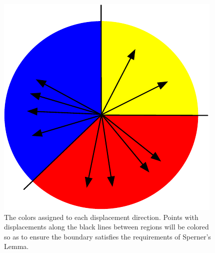   \begin{figure}
    \centering
    \includegraphics[scale=0.5]{ColorMap}
    \caption{The colors assigned to each displacement direction. Points with displacements along the black lines between regions will be colored so as to ensure the boundary satisfies the requirements of Sperner's Lemma.}
    \label{fig:colorMap}
  \end{figure}

